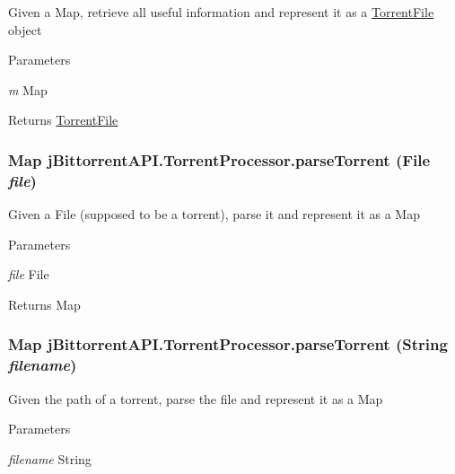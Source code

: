 \label{classj_bittorrent_a_p_i_1_1_torrent_processor_aba7d3c3578e5dc678fd988982871d7c7}
Given a Map, retrieve all useful information and represent it as a \hyperlink{classj_bittorrent_a_p_i_1_1_torrent_file}{TorrentFile} object 
\begin{DoxyParams}{Parameters}
\item[{\em m}]Map \end{DoxyParams}
\begin{DoxyReturn}{Returns}
\hyperlink{classj_bittorrent_a_p_i_1_1_torrent_file}{TorrentFile} 
\end{DoxyReturn}
\hypertarget{classj_bittorrent_a_p_i_1_1_torrent_processor_a3145149480112de51c58ba46ff75c297}{
\subsubsection[{parseTorrent}]{\setlength{\rightskip}{0pt plus 5cm}Map jBittorrentAPI.TorrentProcessor.parseTorrent (File {\em file})}}
\label{classj_bittorrent_a_p_i_1_1_torrent_processor_a3145149480112de51c58ba46ff75c297}
Given a File (supposed to be a torrent), parse it and represent it as a Map 
\begin{DoxyParams}{Parameters}
\item[{\em file}]File \end{DoxyParams}
\begin{DoxyReturn}{Returns}
Map 
\end{DoxyReturn}
\hypertarget{classj_bittorrent_a_p_i_1_1_torrent_processor_a2597c7f2d6bd3a1ff44561930edb1afe}{
\subsubsection[{parseTorrent}]{\setlength{\rightskip}{0pt plus 5cm}Map jBittorrentAPI.TorrentProcessor.parseTorrent (String {\em filename})}}
\label{classj_bittorrent_a_p_i_1_1_torrent_processor_a2597c7f2d6bd3a1ff44561930edb1afe}
Given the path of a torrent, parse the file and represent it as a Map 
\begin{DoxyParams}{Parameters}
\item[{\em filename}]String \end{DoxyParams}
